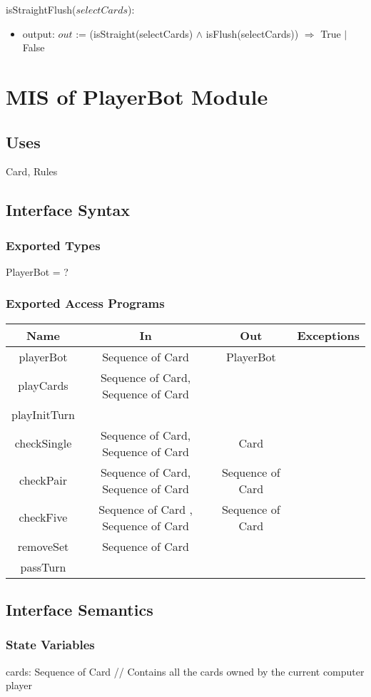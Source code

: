 \documentclass[12pt, titlepage]{article}
\begin{document}
isStraightFlush($selectCards$):
\begin{itemize}
    \item output: $out$ := (isStraight(selectCards) $\land$ isFlush(selectCards)) $\Rightarrow$ True $\mid$ False
\end{itemize}

\section{MIS of PlayerBot Module}
\subsection{Uses}
Card, Rules
\subsection{Interface Syntax}
\subsubsection{Exported Types}
PlayerBot = ?
\subsubsection{Exported Access Programs}
\begin{tabular}[pos]{|c|c|c|c|}
\hline
\textbf{Name}& \textbf{In} & \textbf{Out} & \textbf{Exceptions} \\ \hline
playerBot & Sequence of Card & PlayerBot & ~ \\ \hline
playCards & Sequence of Card, Sequence of Card & ~ & ~\\ \hline
playInitTurn & ~ & ~ & ~\\ \hline
checkSingle & Sequence of Card, Sequence of Card & Card & ~ \\ \hline
checkPair & Sequence of Card, Sequence of Card & Sequence of Card & ~ \\ \hline
checkFive & Sequence of Card , Sequence of Card& Sequence of Card & ~\\ \hline
removeSet & Sequence of Card & ~ & ~ \\ \hline
passTurn & ~ & ~ & ~ \\ \hline
\end{tabular}
\subsection{Interface Semantics}
\subsubsection{State Variables}
cards: Sequence of Card // Contains all the cards owned by the current computer player\\
\end{document}
